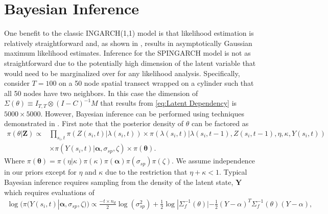 \documentclass[11pt]{isuthesis}
\begin{document}
\section{Bayesian Inference}\label{Sec:Bayes}
One benefit to the classic INGARCH(1,1) model is that likelihood estimation is relatively straightforward and, as shown in \cite{fokianos2009poisson}, results in asymptotically Gaussian maximum likelihood estimates.  Inference for the SPINGARCH model is not as straightforward due to the potentially high dimension of the latent variable that would need to be marginalized over for any likelihood analysis.   Specifically, consider $T=100$ on a 50 node spatial transect wrapped on a cylinder such that all 50 nodes have two neighbors.  In this case the dimension of $\Sigma(\theta)\equiv I_{T,T}\otimes(I-C)^{-1}M$ that results from \eqref{eq:Latent Dependency} is $5000 \times 5000$.  However, Bayesian inference can be performed using techniques demonstrated in \cite{joseph}. First note that the posterior density of $\theta$ can be factored as
\begin{align}
	\pi(\theta | \boldsymbol{Z})\propto & \prod_{s_i,t} \pi(Z(s_i,t)|\lambda(s_i,t))\times\pi(\lambda(s_i,t)|\lambda(s_i,t-1),Z(s_i,t-1),\eta,\kappa,Y(s_i,t))\\
	& \times\pi(Y(s_i,t)|\boldsymbol{\alpha},\sigma_{sp},\zeta)\times\pi(\boldsymbol{\theta}).
\end{align}
Where $\pi(\boldsymbol{\theta})=\pi(\eta|\kappa)\pi(\kappa)\pi(\boldsymbol{\alpha})\pi(\sigma_{sp})\pi(\zeta)$.  We assume independence in our priors except for $\eta$ and $\kappa$ due to the restriction that $\eta+\kappa <1$.  Typical Bayesian inference requires sampling from the density of the latent state, $\boldsymbol{Y}$ which requires evaluations of 
\begin{align}
	\log(\pi(Y(s_i,t)|\boldsymbol{\alpha},\sigma_{sp},\zeta)) \propto \frac{-t \times n_d}{2}\log(\sigma_{sp}^2) + \frac{1}{2} \log | \Sigma_f^{-1}(\theta)| - \frac{1}{2}(Y-\alpha)^T\Sigma_f^{-1}(\theta)(Y-\alpha) \label{eq:log Y},
\end{align}
\end{document}
